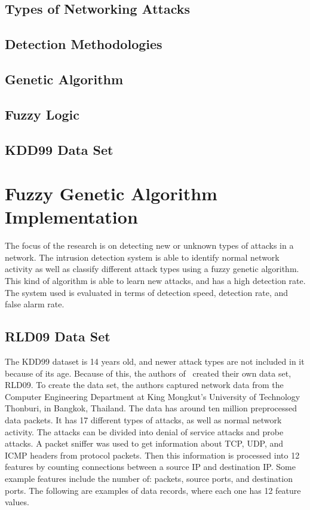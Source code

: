 \documentclass{sig-alternate}
\begin{document}
\subsection{Types of Networking Attacks}

\subsection{Detection Methodologies}

\subsection{Genetic Algorithm}

\subsection{Fuzzy Logic}

\subsection{KDD99 Data Set}





\section{Fuzzy Genetic Algorithm Implementation}
The focus of the research is on detecting new or unknown types of attacks in a network. The intrusion detection system is able to identify normal network activity as well as classify different attack types using a fuzzy genetic algorithm. This kind of algorithm is able to learn new attacks, and has a high detection rate. The system used is evaluated in terms of detection speed, detection rate, and false alarm rate.



\subsection{RLD09 Data Set}
The KDD99 dataset is 14 years old, and newer attack types are not included in it because of its age. Because of this, the authors of~\cite{6496342, 6559603} created their own data set, RLD09. To create the data set, the authors captured network data from the Computer Engineering Department at King Mongkut's University of Technology Thonburi, in Bangkok, Thailand. The data has around ten million preprocessed data packets. It has 17 different types of attacks, as well as normal network activity. The attacks can be divided into denial of service attacks and probe attacks. A packet sniffer was used to get information about TCP, UDP, and ICMP headers from protocol packets. Then this information is processed into 12 features by counting connections between a source IP and destination IP. Some example features include the number of: packets, source ports, and destination ports. The following are examples of data records, where each one has 12 feature values.
\end{document}
